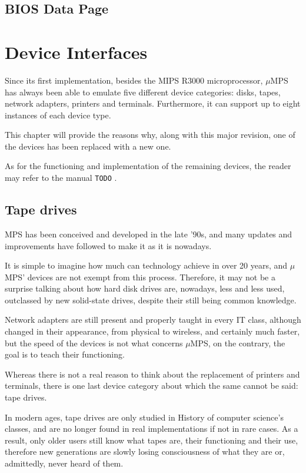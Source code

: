 \documentclass[12pt,a4paper,openright,twoside]{report}
\begin{document}
\section{BIOS Data Page}
\label{chap:bios_data_page}

\chapter{Device Interfaces}
\lhead[\fancyplain{}{\bfseries\thepage}]{\fancyplain{}{\bfseries\rightmark}}
Since its first implementation, besides the MIPS R3000 microprocessor, $\mu$MPS has always been able to emulate five different device categories: disks, tapes, network adapters, printers and terminals.
Furthermore, it can support up to eight instances of each device type.

This chapter will provide the reasons why, along with this major revision, one of the devices has been replaced with a new one.

As for the functioning and implementation of the remaining devices, the reader may refer to the manual \texttt{TODO} \cite{pops}.

\section{Tape drives}
MPS has been conceived and developed in the late '90s, and many updates and improvements have followed to make it as it is nowadays.

It is simple to imagine how much can technology achieve in over 20 years, and $\mu$MPS' devices are not exempt from this process.
Therefore, it may not be a surprise talking about how hard disk drives are, nowadays, less and less used, outclassed by new solid-state drives, despite their still being common knowledge.

Network adapters are still present and properly taught in every IT class, although changed in their appearance, from physical to wireless, and certainly much faster, but the speed of the devices is not what concerns $\mu$MPS, on the contrary, the goal is to teach their functioning.

Whereas there is not a real reason to think about the replacement of printers and terminals, there is one last device category about which the same cannot be said: tape drives.

In modern ages, tape drives are only studied in History of computer science's classes, and are no longer found in real implementations if not in rare cases.
As a result, only older users still know what tapes are, their functioning and their use, therefore new generations are slowly losing consciousness of what they are or, admittedly, never heard of them.
\end{document}
